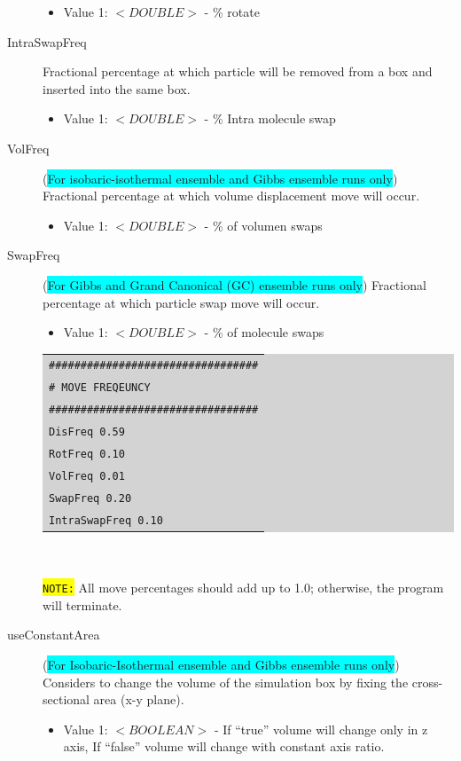 \begin{description}
\begin{itemize}
	\item Value 1: $<DOUBLE>$ - \% rotate
	\end{itemize}
\item [IntraSwapFreq] Fractional percentage at which particle will be removed from a box and inserted into the same box.
	\begin{itemize}
	\item Value 1: $<DOUBLE>$ - \% Intra molecule swap
	\end{itemize}
\item [VolFreq] (\colorbox{cyan}{For isobaric-isothermal ensemble and Gibbs ensemble runs only}) Fractional percentage at which volume displacement move will occur.
	\begin{itemize}
	\item Value 1: $<DOUBLE>$ - \% of volumen swaps
	\end{itemize}
\item [SwapFreq] (\colorbox{cyan}{For Gibbs and Grand Canonical (GC) ensemble runs only}) Fractional percentage at which particle swap move will occur.
	\begin{itemize}
	\item Value 1: $<DOUBLE>$ - \% of molecule swaps
	\end{itemize}
	\colorbox{lightgray}{
	\begin{tabular}{l}
	\texttt{\#\#\#\#\#\#\#\#\#\#\#\#\#\#\#\#\#\#\#\#\#\#\#\#\#\#\#\#\#\#\#\#\#}\\
	\texttt{\#  MOVE FREQEUNCY}\\
	\texttt{\#\#\#\#\#\#\#\#\#\#\#\#\#\#\#\#\#\#\#\#\#\#\#\#\#\#\#\#\#\#\#\#\#}\\
	\texttt{DisFreq   0.59}\\
	\texttt{RotFreq   0.10}\\
	\texttt{VolFreq   0.01}\\
	\texttt{SwapFreq   0.20}\\
	\texttt{IntraSwapFreq   0.10}\\
	\end{tabular}}\\\\
	\colorbox{yellow}{\texttt{NOTE:}} All move percentages should add up to 1.0; otherwise, the program will terminate.
\item [useConstantArea] (\colorbox{cyan}{For Isobaric-Isothermal ensemble and Gibbs ensemble runs only}) Considers to change the volume of the simulation box by fixing the cross-sectional area (x-y plane).
	\begin{itemize}
	\item Value 1: $<BOOLEAN>$ - If ``true'' volume will change only in z axis, If ``false'' volume will change with constant axis ratio.

\end{itemize}
\end{description}
